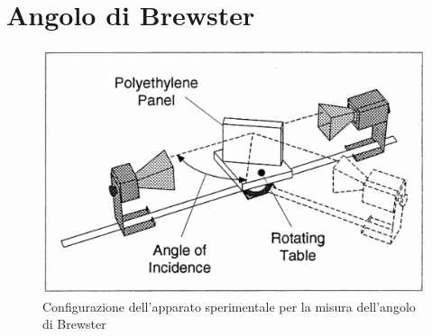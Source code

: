 \section{Angolo di Brewster}
\begin{figure}[h!]
    \centering
    \includegraphics[scale=.3]{Immagini/Schermata 2022-04-07 alle 2.36.29 PM.png}
    \caption{Configurazione dell'apparato sperimentale per la misura dell'angolo di Brewster}
    \label{apparato browser}
\end{figure}

